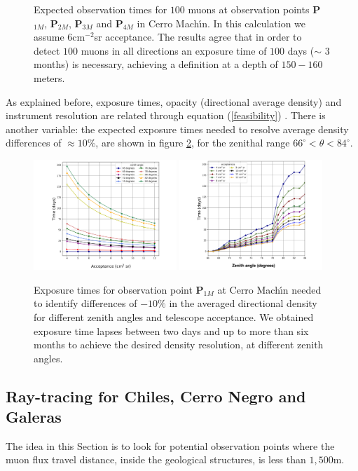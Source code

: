 \documentclass[letterpaper,10pt,titlepage,linenumber]{article}
\begin{document}
\begin{figure}[!ht]
    \caption{Expected observation times for $100$ muons at observation points {\bf P$_{1M}$}, {\bf P$_{2M}$}, {\bf P$_{3M}$} and {\bf P$_{4M}$} in Cerro Mach\'{\i}n. In this calculation we assume $6$cm$^{-2}$sr acceptance. The results agree that in order to detect $100$ muons in all directions an exposure time of $100$ days ($\sim$ 3 months) is necessary, achieving a definition at a depth of $150-160$ meters.}
  \label{time_volcano}
\end{figure}

As explained before, exposure times, opacity (directional average density) and instrument resolution are related through equation (\ref{feasibility})  \cite{LesparreEtal2010}. There  is another variable: the expected exposure times needed to resolve average density differences of $\approx 10$\%, are shown in figure \ref{times},  
for the zenithal range $66^\circ<\theta<84^\circ$. 
\begin{figure}[!ht]
\centering
{\includegraphics[width=0.48\textwidth]{Figures/ta_375_color}}
{\includegraphics[width=0.48\textwidth]{Figures/tt_375_color.png}}
\caption{Exposure times for observation point \textbf{P$_{1M}$} at Cerro Mach\'{\i}n needed to identify differences of $-10\%$ in the averaged directional density for different zenith angles and telescope acceptance. We obtained exposure time lapses between two days and up to more than six months to achieve the desired density resolution, at different zenith angles.}
  \label{times}
\end{figure}


\subsection{Ray-tracing for Chiles, Cerro Negro and Galeras}
\label{RayTracing}
The idea in this Section is to look for potential observation points where the muon flux travel distance, inside the geological structures, is less than $1,500$m.     
\end{document}
